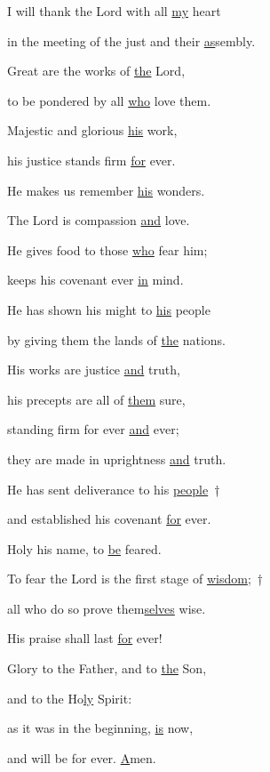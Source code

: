 \noindent I will thank the Lord with all \uline{my} heart ~\GreStar{}~\nopagebreak

in the meeting of the just and their \uline{as}sembly.

\noindent Great are the works of \uline{the} Lord, ~\GreStar{}~\nopagebreak

to be pondered by all \uline{who} love them.



\noindent Majestic and glorious \uline{his} work, ~\GreStar{}~\nopagebreak

his justice stands firm \uline{for} ever.

\noindent He makes us remember \uline{his} wonders. ~\GreStar{}~\nopagebreak

The Lord is compassion \uline{and} love.



\noindent He gives food to those \uline{who} fear him; ~\GreStar{}~\nopagebreak

keeps his covenant ever \uline{in} mind.

\noindent He has shown his might to \uline{his} people ~\GreStar{}~\nopagebreak

by giving them the lands of \uline{the} nations.



\noindent His works are justice \uline{and} truth, ~\GreStar{}~\nopagebreak

his precepts are all of \uline{them} sure,

\noindent standing firm for ever \uline{and} ever; ~\GreStar{}~\nopagebreak

they are made in uprightness \uline{and} truth.



\noindent He has sent deliverance to his \uline{people}~†~\nopagebreak

and established his covenant \uline{for} ever. ~\GreStar{}~\nopagebreak

Holy his name, to \uline{be} feared.



\noindent To fear the Lord is the first stage of \uline{wisdom};~†~\nopagebreak

all who do so prove them\uline{selves} wise. ~\GreStar{}~\nopagebreak

His praise shall last \uline{for} ever!



\noindent Glory to the Father, and to \uline{the} Son,~\GreStar{}~\nopagebreak

and to the Ho\uline{ly} Spirit:

\noindent as it was in the beginning, \uline{is} now,~\GreStar{}~\nopagebreak

and will be for ever. \uline{A}men.
